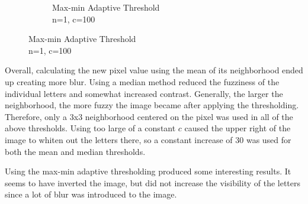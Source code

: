 \documentclass{math}
\begin{document}
\begin{figure}[H]
\begin{subfigure}{0.33\linewidth}
    \caption{Max-min Adaptive Threshold \\ n=1, c=100}
  \end{subfigure}
\end{figure}
Overall, calculating the new pixel value using the mean of its neighborhood
ended up creating more blur. Using a median method reduced the fuzziness of
the individual letters and somewhat increased contrast. Generally, the larger
the neighborhood, the more fuzzy the image became after applying the
thresholding. Therefore, only a 3x3 neighborhood centered on the pixel was used
in all of the above thresholds. Using too large of a constant \( c \) caused
the upper right of the image to whiten out the letters there, so a constant
increase of 30 was used for both the mean and median thresholds. \par
Using the max-min adaptive thresholding produced some interesting results. It
seems to have inverted the image, but did not increase the visibility of the
letters since a lot of blur was introduced to the image.
\end{document}
